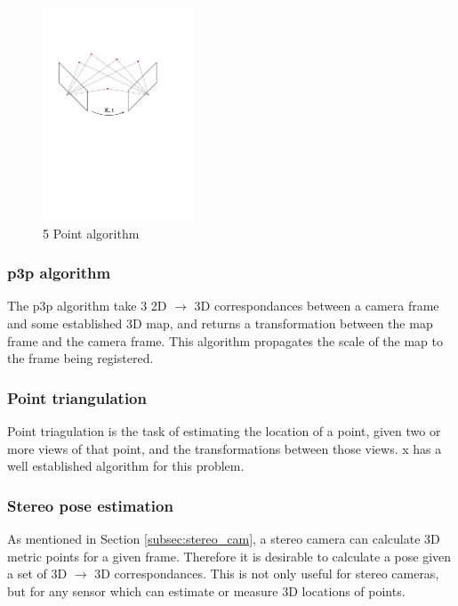 \begin{figure}[h]
  \centering
    \includegraphics[width=0.4\textwidth]{chapters/images/5_point}
  \caption{5 Point algorithm}
  \label{fig:5_point}
\end{figure}

\subsubsection{p3p algorithm}
\label{subsec:p3p}
The p3p algorithm take 3 2D $\rightarrow$ 3D correspondances between a camera frame and some established 3D map, and returns a transformation between the map frame and the camera frame.  This algorithm propagates the scale of the map to the frame being registered.

\subsubsection{Point triangulation}
\label{subsec:point_triangulation}

Point triagulation is the task of estimating the location of a point, given two or more views of that point, and the transformations between those views.  x has a well established algorithm for this problem.


\subsubsection{Stereo pose estimation}
\label{subsec:horn}

As mentioned in Section \ref{subsec:stereo_cam}, a stereo camera can calculate 3D metric points for a given frame.  Therefore it is desirable to calculate a pose given a set of 3D $\rightarrow$ 3D correspondances.  This is not only useful for stereo cameras, but for any sensor which can estimate or measure 3D locations of points.

